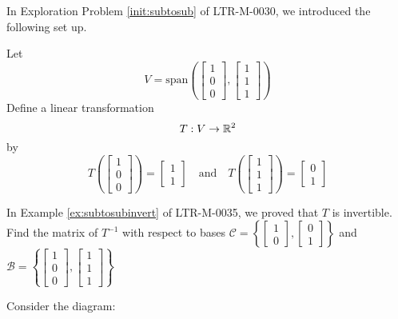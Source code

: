 \documentclass{ximera}
\begin{document}
\begin{example}\label{ex:inversematrixoftransform}
In Exploration Problem \ref{init:subtosub} of LTR-M-0030, we introduced the following set up.

Let $$V=\text{span}\left(\begin{bmatrix}1\\0\\0\end{bmatrix}, \begin{bmatrix}1\\1\\1\end{bmatrix}\right)$$
Define a linear transformation $$T:V\rightarrow \mathbb{R}^2$$
by $$T\left(\begin{bmatrix}1\\0\\0\end{bmatrix}\right)=\begin{bmatrix}1\\1\end{bmatrix}\quad \text{and} \quad T\left(\begin{bmatrix}1\\1\\1\end{bmatrix}\right)=\begin{bmatrix}0\\1\end{bmatrix}$$

In Example \ref{ex:subtosubinvert} of LTR-M-0035, we proved that $T$ is invertible.  Find the matrix of $T^{-1}$ with respect to bases $\mathcal{C}=\left\{\begin{bmatrix}1\\0\end{bmatrix},\begin{bmatrix}0\\1\end{bmatrix}\right\}$ and $\mathcal{B}=\left\{\begin{bmatrix}1\\0\\0\end{bmatrix}, \begin{bmatrix}1\\1\\1\end{bmatrix}\right\}$
\begin{explanation}
Consider the diagram:
\begin{center}
\end{center}
\end{explanation}
\end{example}
\end{document}
